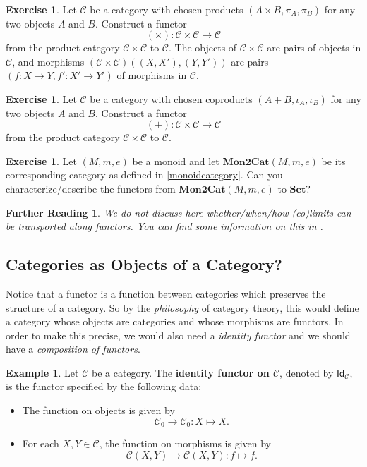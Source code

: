 \documentclass[a4paper,11pt, oneside,titlepage=false]{scrbook}
\theoremstyle{plain}
\newtheorem*{reading*}{Further Reading}
\theoremstyle{definition}
\newtheorem{exa}[thm]{Example}
\newtheorem{exer}[thm]{Exercise}
\newcommand{\cfont}[1]{\ensuremath{\mathsf{#1}}}
\newcommand{\Cat}[1]{\mathcal{#1}}
\newcommand{\CC}{\Cat{C}}
\newcommand{\Catb}[1]{\mathbf{#1}}
\newcommand{\SET}{\Catb{Set}}
\newcommand{\MONtoCAT}{\Catb{Mon2Cat}}
\newcommand{\Ob}[1]{{#1}_0}
\newcommand{\CHom}[3]{{#1}(#2,#3)}
\newcommand{\Id}[1][]{\cfont{Id}_{#1}}
\begin{document}
\begin{exer}
  Let $\CC$ be a category with chosen products $(A\times B, \pi_A, \pi_B)$ for any two objects $A$ and $B$.
  Construct a functor
  \[ (\times) : \CC\times \CC \to \CC\]
  from the product category $\CC\times \CC$ to $\CC$.
  The objects of $\CC\times \CC$ are pairs of objects in $\CC$, and morphisms $\CHom{(\CC\times\CC)}{(X,X')}{(Y,Y')}$ are pairs $(f : X \to Y, f' : X' \to Y')$ of morphisms in $\CC$.
\end{exer}

\begin{exer}
  Let $\CC$ be a category with chosen coproducts $(A + B, \iota_A, \iota_B)$ for any two objects $A$ and $B$.
  Construct a functor
  \[ (+) : \CC\times \CC \to \CC\]
  from the product category $\CC\times \CC$ to $\CC$.
\end{exer}


\begin{exer}\label{ex:monoid_functors} Let $(M,m,e)$ be a monoid and let $\MONtoCAT(M,m,e)$ be its corresponding category as defined in \cref{monoidcategory}. Can you characterize/describe the functors from $\MONtoCAT(M,m,e)$ to $\SET$?
\end{exer}


\begin{reading*}
  We do not discuss here whether/when/how (co)limits can be transported along functors.
  You can find some information on this in \cite[\S 5.3]{leinster}.
\end{reading*}


\subsection{Categories as Objects of a Category?}
Notice that a functor is a function between categories which preserves the structure of a category. So by the \textit{philosophy} of category theory, this would define a category whose objects are categories and whose morphisms are functors. In order to make this precise, we would also need a \textit{identity functor} and we should have a \textit{composition of functors}.

\begin{exa}\label{example:functor_id} Let $\CC$ be a category. The \textbf{identity functor on $\CC$}, denoted by $\Id[\CC]$, is the functor specified by the following data:
\begin{itemize}
\item The function on objects is given by
\[
\Ob{\CC}\to \Ob{\CC}: X\mapsto X.
\]
\item For each $X,Y\in\CC$, the function on morphisms is given by
\[
\CHom \CC X Y\to \CHom \CC X Y: f\mapsto f.
\]
\end{itemize}
\end{exa}
\end{document}
